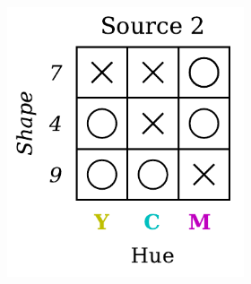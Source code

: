 \begin{dataset}
\begin{figure}[H]
\begin{subfigure}[b]{0.45\textwidth}
\begin{subfigure}[b]{0.48\textwidth}
                \includegraphics[width=\textwidth]{img/datasets/1-CGO_fact=hue_env=1.pdf}
            \end{subfigure}
        \end{subfigure}
        \hfill
        \begin{subfigure}[b]{0.45\textwidth}
            \centering
            \begin{subfigure}[b]{0.48\textwidth}
                \centering

\end{subfigure}
\end{subfigure}
\end{figure}
\end{dataset}
